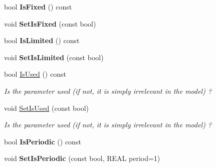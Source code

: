 \begin{Indent}
\begin{DoxyCompactItemize}
bool {\bfseries Is\+Fixed} () const
\item 
\mbox{\label{class_obj_cryst_1_1_refinable_par_a57690ad69493beb8f2b8976c10833640}} 
void {\bfseries Set\+Is\+Fixed} (const bool)
\item 
\mbox{\label{class_obj_cryst_1_1_refinable_par_a35f85e0fc1548a11443ab265e814d6e4}} 
bool {\bfseries Is\+Limited} () const
\item 
\mbox{\label{class_obj_cryst_1_1_refinable_par_a90c20ed99e6782b6a5abc6d5a6abb105}} 
void {\bfseries Set\+Is\+Limited} (const bool)
\item 
\mbox{\label{class_obj_cryst_1_1_refinable_par_aadb7b77e5214d742a2ee21c33a8190c2}} 
bool \mbox{\hyperlink{class_obj_cryst_1_1_refinable_par_aadb7b77e5214d742a2ee21c33a8190c2}{Is\+Used}} () const
\begin{DoxyCompactList}\small\item\em Is the parameter used (if not, it is simply irrelevant in the model) ? \end{DoxyCompactList}\item 
\mbox{\label{class_obj_cryst_1_1_refinable_par_aea29e6822f1a6215c274cacf5c58e7ce}} 
void \mbox{\hyperlink{class_obj_cryst_1_1_refinable_par_aea29e6822f1a6215c274cacf5c58e7ce}{Set\+Is\+Used}} (const bool)
\begin{DoxyCompactList}\small\item\em Is the parameter used (if not, it is simply irrelevant in the model) ? \end{DoxyCompactList}\item 
\mbox{\label{class_obj_cryst_1_1_refinable_par_a1158192a33ea12e4cad0d300eaa13996}} 
bool {\bfseries Is\+Periodic} () const
\item 
\mbox{\label{class_obj_cryst_1_1_refinable_par_a3e131a39649e853afb121ce5c9b5ebe1}} 
void {\bfseries Set\+Is\+Periodic} (const bool, R\+E\+AL period=1)
\item 
\mbox{\label{class_obj_cryst_1_1_refinable_par_a4628611ff72459dd5f525ac5a8571447}} 

\end{DoxyCompactItemize}
\end{Indent}
